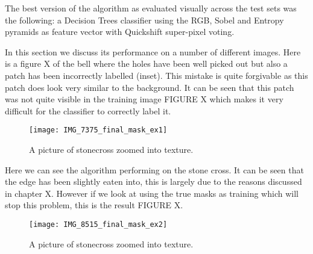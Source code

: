 \documentclass[12pt]{IIBproject}
\begin{document}
The best version of the algorithm as evaluated visually across the test sets was the following: a Decision Trees classifier using the RGB, Sobel and Entropy pyramids as feature vector with Quickshift super-pixel voting. 

In this section we discuss its performance on a number of different images. Here is a figure X of the bell where the holes have been well picked out but also a patch has been incorrectly labelled (inset). This mistake is quite forgivable as this patch does look very similar to the background. It can be seen that this patch was not quite visible in the training image FIGURE X which makes it very difficult for the classifier to correctly label it. 
\begin{figure}[H]
  \caption{A picture of stonecross zoomed into texture.}
  \centering
    \texttt{[image: IMG\_7375\_final\_mask\_ex1]}
\end{figure}

Here we can see the algorithm performing on the stone cross. It can be seen that the edge has been slightly eaten into, this is largely due to the reasons discussed in chapter X. However if we look at using the true masks as training which will stop this problem, this is the result FIGURE X.
\begin{figure}[H]
  \caption{A picture of stonecross zoomed into texture.}
  \centering
    \texttt{[image: IMG\_8515\_final\_mask\_ex2]}
\end{figure}
\end{document}
